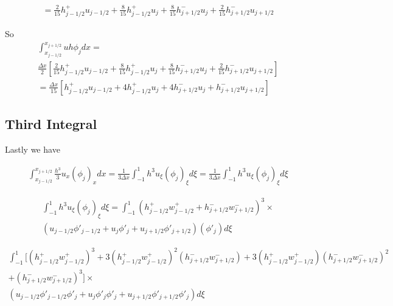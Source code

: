 \documentclass[12pt]{article}
\begin{document}
\begin{multline*}
 = \frac{2}{15} h^+_{j-1/2} u_{j-1/2}  +  \frac{8}{15}h^+_{j-1/2}u_{j}  +
  \frac{8}{15} h^-_{j+1/2} u_{j}  + \frac{2}{15}h^-_{j+1/2} u_{j+1/2} 
\end{multline*}

So 
\begin{multline*}
\int_{x_{j-1/2}}^{x_{j+1/2}}  uh \phi_{j} dx =  \\
\frac{\Delta x}{2} \left[\frac{2}{15} h^+_{j-1/2} u_{j-1/2}  +  \frac{8}{15}h^+_{j-1/2}u_{j}  +
  \frac{8}{15} h^-_{j+1/2} u_{j}  + \frac{2}{15}h^-_{j+1/2} u_{j+1/2}\right] \\ =
\frac{\Delta x}{15} \left[ h^+_{j-1/2} u_{j-1/2}  +  4h^+_{j-1/2}u_{j}  +
  4 h^-_{j+1/2} u_{j}  + h^-_{j+1/2} u_{j+1/2}\right]  
\end{multline*}

\subsection{Third Integral}
Lastly we have

\begin{multline}
\int_{x_{j-1/2}}^{x_{j+1/2}} \frac{h^3}{3}u_{x}{(\phi_{j})}_{x}dx = \frac{1}{3\Delta x}\int_{-1}^{1} {h^3}u_{\xi}{(\phi_{j})}_{\xi}  d\xi = \frac{1}{3\Delta x}\int_{-1}^{1} h^3u_{\xi}{(\phi_{j})}_{\xi}  d\xi 
\end{multline}

\begin{multline}
\int_{-1}^{1} h^3u_{\xi}{(\phi_{j})}_{\xi}  d\xi  = \int_{-1}^{1} \left(h^+_{j-1/2} w^+_{j-1/2} +  h^-_{j+1/2} w^-_{j+1/2} \right)^3 \times\\ \left(u_{j-1/2}\phi'_{j-1/2} + u_{j}\phi'_{j} + u_{j+1/2}\phi'_{j+1/2}\right)(\phi'_{j}) d\xi 
\end{multline}

\begin{multline}
\int_{-1}^{1} \bigg[\left(h^+_{j-1/2} w^+_{j-1/2}\right)^3 + 3\left(h^+_{j-1/2} w^+_{j-1/2}\right)^2\left(h^-_{j+1/2} w^-_{j+1/2}\right) + 3\left(h^+_{j-1/2} w^+_{j-1/2}\right)\left(h^-_{j+1/2} w^-_{j+1/2}\right)^2  \\+  \left(h^-_{j+1/2} w^-_{j+1/2}\right)^3 \bigg] \times\\ \left(u_{j-1/2}\phi'_{j-1/2}\phi'_{j} + u_{j}\phi'_{j}\phi'_{j} + u_{j+1/2}\phi'_{j+1/2}\phi'_{j}\right) d\xi 
\end{multline}
\end{document}
